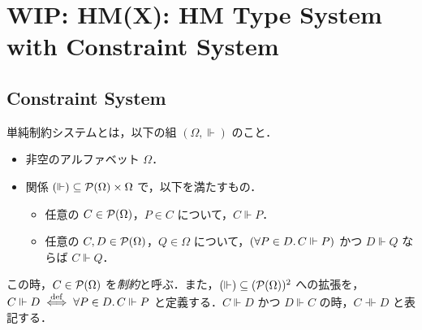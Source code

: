 \section{WIP: HM(X): HM Type System with Constraint System}

\cite{Odersky:1999}\cite{Eekelen:2004}

\subsection{Constraint System}

\begin{definition}
  単純制約システムとは，以下の組 $(\Omega, \Vdash)$ のこと．
  \begin{itemize}
    \item 非空のアルファベット $\Omega$．
    \item 関係 $({\Vdash}) \subseteq \mathcal{P}(\Omega) \times \Omega$ で，以下を満たすもの．
    \begin{itemize}
      \item 任意の $C \in \mathcal{P}(\Omega)$，$P \in C$ について，$C \Vdash P$．
      \item 任意の $C, D \in \mathcal{P}(\Omega)$，$Q \in \Omega$ について，$(\forall P \in D\ldotp C \Vdash P)$ かつ $D \Vdash Q$ ならば $C \Vdash Q$．
    \end{itemize}
  \end{itemize}
  この時，$C \in \mathcal{P}(\Omega)$ を\emph{制約}と呼ぶ．また，$({\Vdash}) \subseteq (\mathcal{P}(\Omega))^2$ への拡張を，$C \Vdash D \mathrel{\overset{\mathrm{def}}{\iff}} \forall P \in D\ldotp C \Vdash P$ と定義する．$C \Vdash D$ かつ $D \Vdash C$ の時，$C \dashVdash D$ と表記する．
\end{definition}
